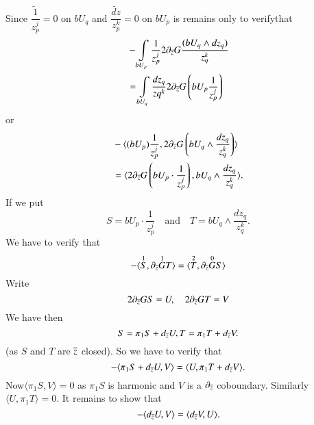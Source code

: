 Since $\dfrac{\widetilde{1}}{z^{j}_{p}}=0$ on $bU_{q}$ and
$\dfrac{\widetilde{dz}}{z^{k}_{p}}=0$ on $bU_{p}$ is remains only to
verify\pageoriginale that
\begin{align*}
& -\int\limits_{bU_{p}}\frac{1}{z_{p}^{j}}2\partial_{\overline{z}} G\frac{(bU_{q}\wedge
  dz_{q})}{z_{q}^{k}}\\
&=\int\limits_{bU_{q}}\frac{dz_{q}}{zq^{k}}2\partial_{\overline{z}}G\left(bU_{p}\frac{1}{z_{p}^{j}}\right) 
\end{align*}
or
\begin{align*}
& -\langle (bU_{p})\frac{1}{z_{p}^{j}},
2\partial_{\overline{z}}G\left(bU_{q}\wedge\frac{dz_q}{z^{k}_{q}}\right)\rangle\\
&=\langle 2\partial_{\overline{z}}G\left(bU_{p}\cdot
\frac{1}{z_{p}^{j}}\right), bU_{q}\wedge \frac{dz_{q}}{z^{k}_{q}}\rangle.
\end{align*}
If we put
$$
S=bU_{p}\cdot \frac{1}{z_{p}^{j}}\quad\text{and}\quad T=bU_{q}\wedge
\frac{dz_{q}}{z^{k}_{q}}.
$$
We have to verify that
$$
-\langle
\overset{1}{S},\partial_{\overline{z}}\overset{1}{G}T\rangle=\langle
\overset{2}{T},\partial_{\overline{z}}\overset{0}{G}S\rangle
$$
Write
$$
2\partial_{\overline{z}}GS=U,\quad 2\partial_{\overline{z}}GT=V
$$
We have then
$$
S=\pi_{1}S+d_{\overline{z}}U, T=\pi_{1}T+d_{\overline{z}}V.
$$
(as $S$ and $T$ are $\overline{z}$ closed). So we have to verify that
$$
-\langle\pi_{1}S+d_{\overline{z}}U,V\rangle=\langle
U,\pi_{1}T+d_{\overline{z}}V\rangle. 
$$
Now\pageoriginale $\langle\pi_{1}S,V\rangle=0$ as $\pi_{1}S$ is
harmonic and $V$ is a $\partial_{\overline{z}}$ coboundary. Similarly
$\langle U,\pi_{1}T\rangle=0$. It remains to show that
$$
-\langle d_{\overline{z}}U,V\rangle=\langle d_{\overline{z}}V,U\rangle.
$$

